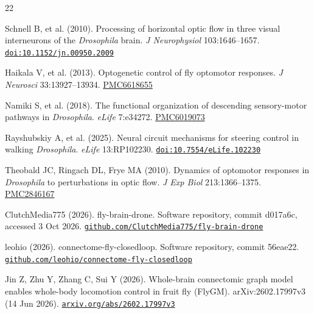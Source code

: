 \documentclass[11pt,letterpaper]{article}
\begin{document}
\begin{thebibliography}{22}

\protect{}\label{ref-8}{Schnell B, et al. (2010).
Processing of horizontal optic flow in three visual interneurons of the
\emph{Drosophila} brain. \emph{J Neurophysiol} 103:1646--1657.
\href{https://doi.org/10.1152/jn.00950.2009}{\nolinkurl{doi:10.1152/jn.00950.2009}}}


\protect{}\label{ref-9}{Haikala V, et al. (2013).
Optogenetic control of fly optomotor responses. \emph{J Neurosci}
33:13927--13934.
\href{https://pmc.ncbi.nlm.nih.gov/articles/PMC6618655/}{PMC6618655}}


\protect{}\label{ref-10}{Namiki S, et al. (2018). The
functional organization of descending sensory-motor pathways in
\emph{Drosophila}. \emph{eLife} 7:e34272.
\href{https://pmc.ncbi.nlm.nih.gov/articles/PMC6019073/}{PMC6019073}}


\protect{}\label{ref-11}{Rayshubskiy A, et al. (2025).
Neural circuit mechanisms for steering control in walking
\emph{Drosophila}. \emph{eLife} 13:RP102230.
\href{https://doi.org/10.7554/eLife.102230}{\nolinkurl{doi:10.7554/eLife.102230}}}


\protect{}\label{ref-12}{Theobald JC, Ringach DL, Frye MA
(2010). Dynamics of optomotor responses in \emph{Drosophila} to
perturbations in optic flow. \emph{J Exp Biol} 213:1366--1375.
\href{https://pmc.ncbi.nlm.nih.gov/articles/PMC2846167/}{PMC2846167}}


\protect{}\label{ref-13}{ClutchMedia775 (2026).
fly-brain-drone. Software repository, commit d017a6c, accessed 3 Oct
2026.
\href{https://github.com/ClutchMedia775/fly-brain-drone}{\nolinkurl{github.com/ClutchMedia775/fly-brain-drone}}}


\protect{}\label{ref-14}{leohio (2026).
connectome-fly-closedloop. Software repository, commit 56eae22.
\href{https://github.com/leohio/connectome-fly-closedloop}{\nolinkurl{github.com/leohio/connectome-fly-closedloop}}}


\protect{}\label{ref-15}{Jin Z, Zhu Y, Zhang C, Sui Y
(2026). Whole-brain connectomic graph model enables whole-body
locomotion control in fruit fly (FlyGM). arXiv:2602.17997v3 (14 Jun
2026).
\href{https://arxiv.org/abs/2602.17997v3}{\nolinkurl{arxiv.org/abs/2602.17997v3}}}


\end{thebibliography}
\end{document}
